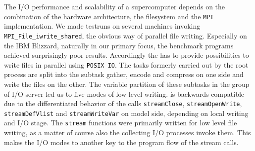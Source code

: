 The I/O performance and scalability of a supercomputer depends on the combination 
of the hardware architecture, the filesystem and the {\tt MPI} implementation. We 
made testruns on several machines invoking {\tt MPI\_File\_iwrite\_shared}, the 
obvious way of parallel file writing.  
Especially on the IBM Blizzard, naturally in our primary focus, the 
benchmark programs achieved surprisingly poor results. 
Accordingly the {\CDI} has to provide possibilities to write files in parallel 
using {\tt POSIX IO}.
The tasks formerly carried out by the root process are split into the subtask 
gather, encode and compress on one side and write the files on the other. The 
variable partition of these subtasks in the group of I/O server led us to five 
modes of low level writing. 
{\pio} is backwards compatible due to the differentiated behavior of the {\CDI} 
calls {\tt streamClose}, {\tt streamOpenWrite}, {\tt streamDefVlist}
and {\tt streamWriteVar} on model side, depending on local writing and I/O stage. 
 The {\tt stream} functions were primarily written for low level file writing, 
as a matter of course 
 also the collecting I/O processes invoke them. This makes the I/O modes to 
another key to the program flow of the {\CDI} stream calls.
